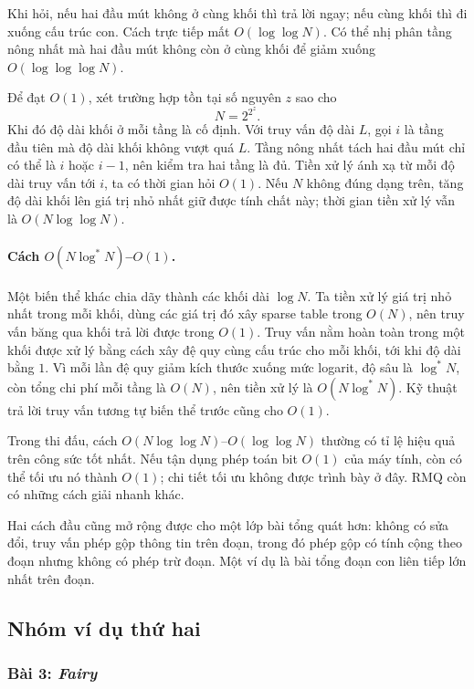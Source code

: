 \documentclass[11pt]{article}
\begin{document}
Khi hỏi, nếu hai đầu mút không ở cùng khối thì trả lời ngay; nếu cùng khối thì
đi xuống cấu trúc con. Cách trực tiếp mất \(O(\log\log N)\). Có thể nhị phân
tầng nông nhất mà hai đầu mút không còn ở cùng khối để giảm xuống
\(O(\log\log\log N)\).

Để đạt \(O(1)\), xét trường hợp tồn tại số nguyên \(z\) sao cho
\[
  N=2^{2^z}.
\]
Khi đó độ dài khối ở mỗi tầng là cố định. Với truy vấn độ dài \(L\), gọi \(i\)
là tầng đầu tiên mà độ dài khối không vượt quá \(L\). Tầng nông nhất tách hai
đầu mút chỉ có thể là \(i\) hoặc \(i-1\), nên kiểm tra hai tầng là đủ. Tiền xử
lý ánh xạ từ mỗi độ dài truy vấn tới \(i\), ta có thời gian hỏi \(O(1)\). Nếu
\(N\) không đúng dạng trên, tăng độ dài khối lên giá trị nhỏ nhất giữ được
tính chất này; thời gian tiền xử lý vẫn là \(O(N\log\log N)\).

\paragraph{Cách \(O(N\log^* N)\)--\(O(1)\).}
Một biến thể khác chia dãy thành các khối dài \(\log N\). Ta tiền xử lý giá
trị nhỏ nhất trong mỗi khối, dùng các giá trị đó xây sparse table trong
\(O(N)\), nên truy vấn băng qua khối trả lời được trong \(O(1)\). Truy vấn
nằm hoàn toàn trong một khối được xử lý bằng cách xây đệ quy cùng cấu trúc cho
mỗi khối, tới khi độ dài bằng \(1\). Vì mỗi lần đệ quy giảm kích thước xuống
mức logarit, độ sâu là \(\log^*N\), còn tổng chi phí mỗi tầng là \(O(N)\), nên
tiền xử lý là \(O(N\log^*N)\). Kỹ thuật trả lời truy vấn tương tự biến thể
trước cũng cho \(O(1)\).

Trong thi đấu, cách \(O(N\log\log N)\)--\(O(\log\log N)\) thường có tỉ lệ
hiệu quả trên công sức tốt nhất. Nếu tận dụng phép toán bit \(O(1)\) của máy
tính, còn có thể tối ưu nó thành \(O(1)\); chi tiết tối ưu không được trình
bày ở đây.
RMQ còn có những cách giải nhanh khác.

Hai cách đầu cũng mở rộng được cho một lớp bài tổng quát hơn: không có sửa
đổi, truy vấn phép gộp thông tin trên đoạn, trong đó phép gộp có tính cộng
theo đoạn nhưng không có phép trừ đoạn. Một ví dụ là bài tổng đoạn con liên
tiếp lớn nhất trên đoạn.

\subsection{Nhóm ví dụ thứ hai}

\subsubsection{Bài 3: \emph{Fairy}}
\end{document}
